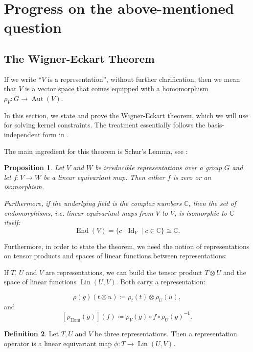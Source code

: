 \documentclass[12pt, a4paper]{article}
\theoremstyle{plain}
\newtheorem{pro}{Proposition}[section]
\theoremstyle{definition}
\newtheorem{dfn}[pro]{Definition}
\theoremstyle{remark}
\newcommand{\C}{\mathds{C}}
\DeclareMathOperator{\lin}{Lin}
\DeclareMathOperator{\aut}{Aut}
\DeclareMathOperator{\End}{End}
\DeclareMathOperator{\Id}{Id}
\begin{document}
\section{Progress on the above-mentioned question}

\subsection{The Wigner-Eckart Theorem}

If we write ``$V$ is a representation'', without further clarification, then we mean that $V$ is a vector space that comes equipped with a homomorphism $\rho_V: G \to \aut (V)$.

In this section, we state and prove the Wigner-Eckart theorem, which we will use for solving kernel constraints. The treatment essentially follows the basis-independent form in \cite{wigner-eckart}.

The main ingredient for this theorem is Schur's Lemma, see \cite{Jeevanjee}:

\begin{pro}\label{Schur}
Let $V$ and $W$ be irreducible representations over a group $G$ and let $f: V \to W$ be a linear equivariant map. Then either $f$ is zero or an isomorphism.

Furthermore, if the underlying field is the complex numbers $\C$, then the set of endomorphisms, i.e. linear equivariant maps from $V$ to $V$, is isomorphic to $\C$ itself:
\begin{equation*}
\End(V) = \{c \cdot \Id_V \mid c \in \C\} \cong \C.
\end{equation*}
\end{pro}

Furthermore, in order to state the theorem, we need the notion of representations on tensor products and spaces of linear functions between representations:

If $T$, $U$ and $V$ are representations, we can build the tensor product $T \otimes U$ and the space of linear functions $\lin(U, V)$. Both carry a representation:

\begin{equation*}
\rho(g)(t \otimes u) \coloneqq \rho_t(t) \otimes \rho_U(u),
\end{equation*}
and
\begin{equation*}
\left[\rho_{\text{Hom}}(g)\right](f) \coloneq \rho_V(g) \circ f \circ \rho_U(g)^{-1}.
\end{equation*}

\begin{dfn}
Let $T, U$ and $V$ be three representations. Then a representation operator is a linear equivariant map $\phi: T \to \lin(U, V)$.
\end{dfn}
\end{document}
